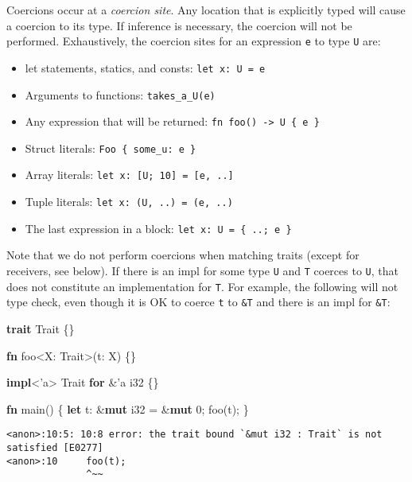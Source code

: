 \documentclass[a4paper,]{book}
\newenvironment{Shaded}{\begin{snugshade}}{\end{snugshade}}
\newcommand{\KeywordTok}[1]{\textcolor[rgb]{0.13,0.29,0.53}{\textbf{{#1}}}}
\newcommand{\DataTypeTok}[1]{\textcolor[rgb]{0.13,0.29,0.53}{{#1}}}
\newcommand{\DecValTok}[1]{\textcolor[rgb]{0.00,0.00,0.81}{{#1}}}
\newcommand{\OtherTok}[1]{\textcolor[rgb]{0.56,0.35,0.01}{{#1}}}
\newcommand{\NormalTok}[1]{{#1}}
\providecommand{\tightlist}{%
  \setlength{\itemsep}{0pt}\setlength{\parskip}{0pt}}
\begin{document}
Coercions occur at a \emph{coercion site}. Any location that is
explicitly typed will cause a coercion to its type. If inference is
necessary, the coercion will not be performed. Exhaustively, the
coercion sites for an expression \texttt{e} to type \texttt{U} are:

\begin{itemize}
\tightlist
\item
  let statements, statics, and consts: \texttt{let\ x:\ U\ =\ e}
\item
  Arguments to functions: \texttt{takes\_a\_U(e)}
\item
  Any expression that will be returned:
  \texttt{fn\ foo()\ -\textgreater{}\ U\ \{\ e\ \}}
\item
  Struct literals: \texttt{Foo\ \{\ some\_u:\ e\ \}}
\item
  Array literals: \texttt{let\ x:\ {[}U;\ 10{]}\ =\ {[}e,\ ..{]}}
\item
  Tuple literals: \texttt{let\ x:\ (U,\ ..)\ =\ (e,\ ..)}
\item
  The last expression in a block: \texttt{let\ x:\ U\ =\ \{\ ..;\ e\ \}}
\end{itemize}

Note that we do not perform coercions when matching traits (except for
receivers, see below). If there is an impl for some type \texttt{U} and
\texttt{T} coerces to \texttt{U}, that does not constitute an
implementation for \texttt{T}. For example, the following will not type
check, even though it is OK to coerce \texttt{t} to \texttt{\&T} and
there is an impl for \texttt{\&T}:

\begin{Shaded}
\begin{Highlighting}[]
\KeywordTok{trait} \NormalTok{Trait \{\}}

\KeywordTok{fn} \NormalTok{foo<X: Trait>(t: X) \{\}}

\KeywordTok{impl}\NormalTok{<}\OtherTok{'a}\NormalTok{> Trait }\KeywordTok{for} \NormalTok{&}\OtherTok{'a} \DataTypeTok{i32} \NormalTok{\{\}}


\KeywordTok{fn} \NormalTok{main() \{}
    \KeywordTok{let} \NormalTok{t: &}\KeywordTok{mut} \DataTypeTok{i32} \NormalTok{= &}\KeywordTok{mut} \DecValTok{0}\NormalTok{;}
    \NormalTok{foo(t);}
\NormalTok{\}}
\end{Highlighting}
\end{Shaded}

\begin{verbatim}
<anon>:10:5: 10:8 error: the trait bound `&mut i32 : Trait` is not satisfied [E0277]
<anon>:10     foo(t);
              ^~~
\end{verbatim}
\end{document}
